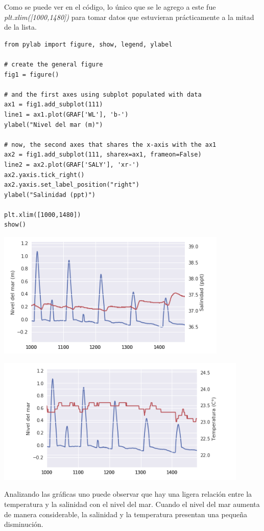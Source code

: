 \documentclass{article}
\begin{document}
Como se puede ver en el código, lo único que se le agrego a este fue \textit{plt.xlim([1000,1480])} para tomar datos que estuvieran prácticamente a la mitad de la lista.

\vspace{0.5cm}

\begin{verbatim}
from pylab import figure, show, legend, ylabel
 
# create the general figure
fig1 = figure()
 
# and the first axes using subplot populated with data 
ax1 = fig1.add_subplot(111)
line1 = ax1.plot(GRAF['WL'], 'b-')
ylabel("Nivel del mar (m)")
 
# now, the second axes that shares the x-axis with the ax1
ax2 = fig1.add_subplot(111, sharex=ax1, frameon=False)
line2 = ax2.plot(GRAF['SALY'], 'xr-')
ax2.yaxis.tick_right()
ax2.yaxis.set_label_position("right")
ylabel("Salinidad (ppt)")

plt.xlim([1000,1480])
show()
\end{verbatim}

\vspace{0.4cm}

\begin{center}
	\includegraphics[width=11cm]{WL+SALY_lim.png}
      
\end{center}
\vspace{0.2cm}

\begin{center}
	\includegraphics[width=12cm]{WL+TEMP_lim.png}
        
\end{center}
\vspace{0.5cm}

Analizando las gráficas uno puede observar que hay una ligera relación entre la temperatura y la salinidad con el nivel del mar.
Cuando el nivel del mar aumenta de manera considerable, la salinidad y la temperatura presentan una pequeña disminución.
\end{document}
